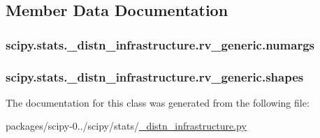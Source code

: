 \subsection{Member Data Documentation}
\hypertarget{classscipy_1_1stats_1_1__distn__infrastructure_1_1rv__generic_ad727ed0100f91f82174a381d3ee58886}{}
\subsubsection[{numargs}]{\setlength{\rightskip}{0pt plus 5cm}scipy.\+stats.\+\_\+distn\+\_\+infrastructure.\+rv\+\_\+generic.\+numargs}\label{classscipy_1_1stats_1_1__distn__infrastructure_1_1rv__generic_ad727ed0100f91f82174a381d3ee58886}
\hypertarget{classscipy_1_1stats_1_1__distn__infrastructure_1_1rv__generic_a6dffc670248d521a82706cf81ac54996}{}
\subsubsection[{shapes}]{\setlength{\rightskip}{0pt plus 5cm}scipy.\+stats.\+\_\+distn\+\_\+infrastructure.\+rv\+\_\+generic.\+shapes}\label{classscipy_1_1stats_1_1__distn__infrastructure_1_1rv__generic_a6dffc670248d521a82706cf81ac54996}


The documentation for this class was generated from the following file\+:\begin{DoxyCompactItemize}
\item 
packages/scipy-\/0../scipy/stats/\hyperlink{__distn__infrastructure_8py}{\+\_\+distn\+\_\+infrastructure.\+py}\end{DoxyCompactItemize}
